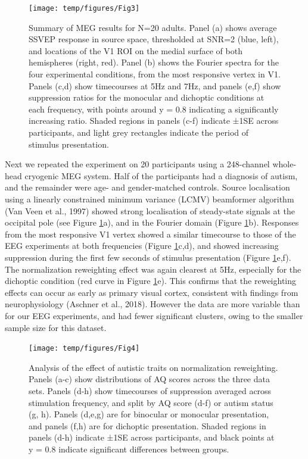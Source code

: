 \documentclass[
]{article}
\begin{document}
\begin{figure}

{\centering \texttt{[image: temp/figures/Fig3]} 

}

\caption{Summary of MEG results for N=20 adults. Panel (a) shows average SSVEP response in source space, thresholded at SNR=2 (blue, left), and locations of the V1 ROI on the medial surface of both hemispheres (right, red). Panel (b) shows the Fourier spectra for the four experimental conditions, from the most responsive vertex in V1. Panels (c,d) show timecourses at 5Hz and 7Hz, and panels (e,f) show suppression ratios for the monocular and dichoptic conditions at each frequency, with points around y = 0.8 indicating a significantly increasing ratio. Shaded regions in panels (c-f) indicate ±1SE across participants, and light grey rectangles indicate the period of stimulus presentation.}\label{fig:MEGdata}
\end{figure}

Next we repeated the experiment on 20 participants using a 248-channel whole-head cryogenic MEG system. Half of the participants had a diagnosis of autism, and the remainder were age- and gender-matched controls. Source localisation using a linearly constrained minimum variance (LCMV) beamformer algorithm (Van Veen et al., 1997) showed strong localisation of steady-state signals at the occipital pole (see Figure \ref{fig:MEGdata}a), and in the Fourier domain (Figure \ref{fig:MEGdata}b). Responses from the most responsive V1 vertex showed a similar timecourse to those of the EEG experiments at both frequencies (Figure \ref{fig:MEGdata}c,d), and showed increasing suppression during the first few seconds of stimulus presentation (Figure \ref{fig:MEGdata}e,f). The normalization reweighting effect was again clearest at 5Hz, especially for the dichoptic condition (red curve in Figure \ref{fig:MEGdata}e). This confirms that the reweighting effects can occur as early as primary visual cortex, consistent with findings from neurophysiology (Aschner et al., 2018). However the data are more variable than for our EEG experiments, and had fewer significant clusters, owing to the smaller sample size for this dataset.

\begin{figure}

{\centering \texttt{[image: temp/figures/Fig4]} 

}

\caption{Analysis of the effect of autistic traits on normalization reweighting. Panels (a-c) show distributions of AQ scores across the three data sets. Panels (d-h) show timecourses of suppression averaged across stimulation frequency, and split by AQ score (d-f) or autism status (g, h). Panels (d,e,g) are for binocular or monocular presentation, and panels (f,h) are for dichoptic presentation. Shaded regions in panels (d-h) indicate ±1SE across participants, and black points at y = 0.8 indicate significant differences between groups.}\label{fig:AQanalysis}
\end{figure}
\end{document}
